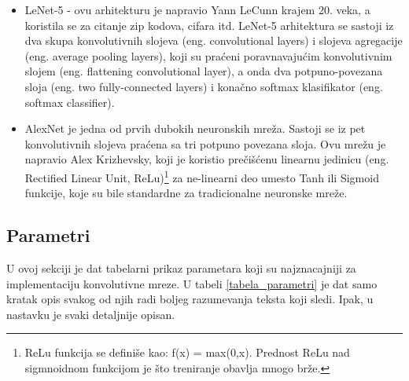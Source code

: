 \documentclass[a4paper]{article}
\begin{document}
\begin{itemize}

\item LeNet-5 - ovu arhitekturu je napravio Yann LeCunn krajem 20. veka, a koristila se za citanje zip kodova, cifara itd. LeNet-5 arhitektura se sastoji iz dva skupa konvolutivnih slojeva (eng. convolutional layers) i slojeva agregacije (eng. average pooling layers), koji su praćeni poravnavajućim konvolutivnim slojem (eng. flattening convolutional layer), a onda dva potpuno-povezana sloja (eng. two fully-connected layers) i konačno softmax klasifikator (eng. softmax classifier).

\item AlexNet je jedna od prvih dubokih neuronskih mreža. Sastoji se iz pet konvolutivnih slojeva praćena sa tri potpuno povezana sloja.
Ovu mrežu je napravio Alex Krizhevsky, koji je koristio prečišćenu linearnu jedinicu (eng. Rectified Linear Unit, ReLu)\footnote{ReLu funkcija se definiše kao: f(x) = max(0,x). Prednost ReLu nad sigmnoidnom funkcijom je što treniranje obavlja mnogo brže.} za ne-linearni deo umesto Tanh ili Sigmoid funkcije, koje su bile standardne za tradicionalne neuronske mreže.




\end{itemize}



\subsection{Parametri}

U ovoj sekciji je dat tabelarni prikaz parametara koji su najznacajniji za implementaciju konvolutivne mreze. U tabeli \ref{tabela_parametri} je dat samo kratak opis svakog od njih radi boljeg razumevanja teksta koji sledi. Ipak, u nastavku je svaki detaljnije opisan.
\end{document}

